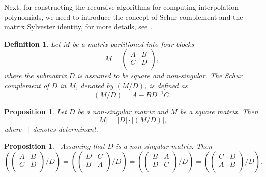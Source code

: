 \documentclass[preprint,12pt]{elsarticle}
\newtheorem{definition}{Definition}%
\newtheorem{proposition}[theorem]{Proposition}
\begin{document}
Next, for constructing the recursive algorithms for computing interpolation polynomials, we need to  introduce  the concept of  Schur complement and the matrix Sylvester identity, for more details, see \cite{wen24,F,G,wen26}.
\begin{definition}\label{def:schur}\cite{wen24}
Let $M$ be a matrix partitioned into four blocks
\begin{equation*}
    M=\left(
        \begin{array}{cc}
          A & B \\
          C & D \\
        \end{array}
      \right),
\end{equation*}
where the submatrix $D$ is assumed to be square and non-singular. The Schur complement of $D$ in $M$, denoted by $(M/D)$, is defined as
\begin{equation*}\label{equa2.6}
(M/D) = A - BD^{-1}C.
\end{equation*}
\end{definition}

\begin{proposition}\label{prop:rank}\cite{wen24}
Let $D$ be a non-singular matrix and $M$ be a square matrix. Then 
\begin{equation*}\label{equa2.7}
|M| = |D|\cdot|(M/D)|,
\end{equation*}
where $|\cdot|$ denotes determinant.
\end{proposition}

\begin{proposition}\label{prop:change}\cite{wen20,wen25}%
~Assuming that $D$ is a non-singular matrix. Then
\begin{equation*}\label{equa2.8}
\left(\left(
   \begin{array}{cc}
     A & B \\
     C & D \\
   \end{array}
 \right)
/D\right)=\left(\left(
   \begin{array}{cc}
     D & C \\
     B & A \\
   \end{array}
 \right)
/D\right)=\left(\left(
   \begin{array}{cc}
     B & A \\
     D & C \\
   \end{array}
 \right)
/D\right)=\left(\left(
   \begin{array}{cc}
     C & D \\
     A & B \\
   \end{array}
 \right)
/D\right).
\end{equation*}
\end{proposition}
\end{document}

